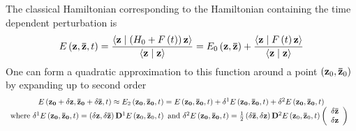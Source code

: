 \documentclass{amsart}
\begin{document}
The classical Hamiltonian corresponding to the Hamiltonian containing the
time dependent perturbation is
\[
E\left( {{\rm {\bf z}},{\rm {\bf \bar {z}}},t} \right)=\frac{\left\langle
{{\rm {\bf z}}} \mathrel{\left| {\vphantom {{\rm {\bf z}} {\left( {H_0
+F\left( t \right)} \right){\rm {\bf z}}}}} \right.
\kern-\nulldelimiterspace} {\left( {H_0 +F\left( t \right)} \right){\rm {\bf
z}}} \right\rangle }{\left\langle {{\rm {\bf z}}} \mathrel{\left| {\vphantom
{{\rm {\bf z}} {\rm {\bf z}}}} \right. \kern-\nulldelimiterspace} {{\rm {\bf
z}}} \right\rangle }=E_0 \left( {{\rm {\bf z}},{\rm {\bf \bar {z}}}}
\right)+\frac{\left\langle {{\rm {\bf z}}} \mathrel{\left| {\vphantom {{\rm
{\bf z}} {F\left( t \right){\rm {\bf z}}}}} \right.
\kern-\nulldelimiterspace} {F\left( t \right){\rm {\bf z}}} \right\rangle
}{\left\langle {{\rm {\bf z}}} \mathrel{\left| {\vphantom {{\rm {\bf z}}
{\rm {\bf z}}}} \right. \kern-\nulldelimiterspace} {{\rm {\bf z}}}
\right\rangle }
\]
One can form a quadratic approximation to this function around a point
$\left( {{\rm {\bf z}}_0 ,{\rm {\bf \bar {z}}}_0 } \right)\mbox{ }$ by
expanding up to second order
\[
\begin{array}{c}
 E\left( {{\rm {\bf z}}_{\rm {\bf 0}} +\delta {\rm {\bf z}},{\rm {\bf \bar
{z}}}_{\rm {\bf 0}} +\delta {\rm {\bf \bar {z}}},t} \right)\approx E_2
\left( {{\rm {\bf z}}_{\rm {\bf 0}} ,{\rm {\bf \bar {z}}}_{\rm {\bf 0}} ,t}
\right)=E\left( {{\rm {\bf z}}_{\rm {\bf 0}} ,{\rm {\bf \bar {z}}}_{\rm {\bf
0}} ,t} \right)+\delta ^1E\left( {{\rm {\bf z}}_{\rm {\bf 0}} ,{\rm {\bf
\bar {z}}}_{\rm {\bf 0}} ,t} \right)+\delta ^2E\left( {{\rm {\bf z}}_{\rm
{\bf 0}} ,{\rm {\bf \bar {z}}}_{\rm {\bf 0}} ,t} \right) \\
 \mbox{where }\delta ^1E\left( {{\rm {\bf z}}_{\rm {\bf 0}} ,{\rm {\bf \bar
{z}}}_{\rm {\bf 0}} ,t} \right)=\left( {\delta {\rm {\bf z}},\delta {\rm
{\bf \bar {z}}}} \right){\rm {\bf D}}^1E\left( {{\rm {\bf z}}_0 ,{\rm {\bf
\bar {z}}}_0 ,t} \right)\mbox{ and }\delta ^2E\left( {{\rm {\bf z}}_{\rm
{\bf 0}} ,{\rm {\bf \bar {z}}}_{\rm {\bf 0}} ,t} \right)=\frac{1}{2}\left(
{\delta {\rm {\bf \bar {z}}},\delta {\rm {\bf z}}} \right){\rm {\bf
D}}^2E\left( {{\rm {\bf z}}_0 ,{\rm {\bf \bar {z}}}_0 ,t} \right)\left(
{{\begin{array}{*{20}c}
 {\delta {\rm {\bf \bar {z}}}} \hfill \\
 {\delta {\rm {\bf z}}} \hfill \\
\end{array} }} \right)\mbox{ } \\
 \end{array}
\]
\end{document}
